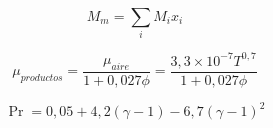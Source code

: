 
\begin{equation}\label{eq:mw}
  M_{m} = \sum_{i} M_{i}x_{i}
\end{equation}

\begin{equation}\label{eq:mu}
  \mu_{productos} = \frac{\mu_{aire}} {1 + 0,027 \phi} = \frac{3,3\times 10^{-7} T^{0,7}} {1 + 0,027 \phi}
\end{equation}

\begin{equation}\label{eq:pr}
    \Pr = 0,05 + 4,2 (\gamma - 1) - 6,7 {(\gamma - 1)}^{2}
\end{equation}
